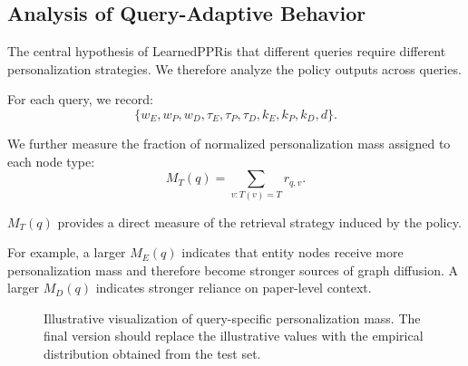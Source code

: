 \documentclass[conference]{IEEEtran}
\newcommand{\method}{LearnedPPR}
\newcommand{\q}{q}
\begin{document}
\subsection{Analysis of Query-Adaptive Behavior}

The central hypothesis of \method is that different queries require
different personalization strategies. We therefore analyze the policy
outputs across queries.

For each query, we record:
\begin{equation}
\{
w_E,w_P,w_D,
\tau_E,\tau_P,\tau_D,
k_E,k_P,k_D,
d
\}.
\end{equation}

We further measure the fraction of normalized personalization mass
assigned to each node type:
\begin{equation}
M_T(\q)
=
\sum_{v:T(v)=T} r_{\q,v}.
\label{eq:mass-type}
\end{equation}

$M_T(\q)$ provides a direct measure of the retrieval strategy induced
by the policy.

For example, a larger $M_E(\q)$ indicates that entity nodes receive
more personalization mass and therefore become stronger sources of
graph diffusion. A larger $M_D(\q)$ indicates stronger reliance on
paper-level context.



\begin{figure}[t]
\centering


\caption{
Illustrative visualization of query-specific personalization mass.
The final version should replace the illustrative values with the
empirical distribution obtained from the test set.
}
\label{fig:mass}
\end{figure}
\end{document}
